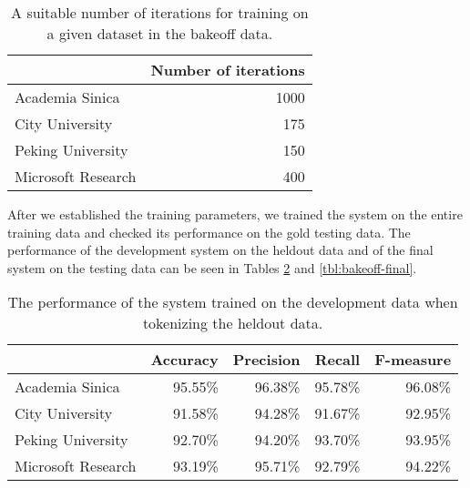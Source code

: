 \begin{table}
  \begin{center}
    \begin{tabular}{ | l | r | }
      \hline
      & Number of iterations \\ \hline
      Academia Sinica & 1000 \\ \hline
      City University & 175 \\ \hline
      Peking University & 150 \\ \hline
      Microsoft Research & 400 \\
      \hline
    \end{tabular}
  \end{center}
  \caption[Recommended iterations for Chinese segmentation]
    {A suitable number of iterations for training on a given dataset in the
     bakeoff data.}
  \label{tbl:bakeoff-iters}
\end{table}

After we established the training parameters, we trained the system on the
entire training data and checked its performance on the gold testing data. The
performance of the development system on the heldout data and of the final
system on the testing data can be seen in Tables \ref{tbl:bakeoff-devel} and
\ref{tbl:bakeoff-final}.

\begin{table}
  \begin{center}
    \begin{tabular}{ | l | r | r | r | r | }
      \hline
      & Accuracy & Precision & Recall & F-measure \\ \hline
      Academia Sinica & 95.55\% & 96.38\% & 95.78\% & 96.08\% \\ \hline
      City University & 91.58\% & 94.28\% & 91.67\% & 92.95\% \\ \hline
      Peking University & 92.70\% & 94.20\% & 93.70\% & 93.95\% \\ \hline
      Microsoft Research & 93.19\% & 95.71\% & 92.79\% & 94.22\% \\
      \hline
    \end{tabular}
  \end{center}
  \caption[Development performance of Chinese segmenter]
    {The performance of the system trained on the development data when
     tokenizing the heldout data.}
  \label{tbl:bakeoff-devel}
\end{table}

